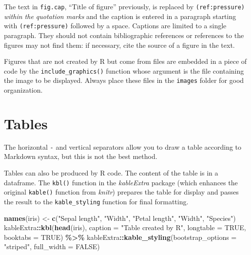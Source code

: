 \documentclass[
  12pt,
  american,
  a4paper,
  extrafontsizes,onecolumn,openright
  ]{memoir}
\newenvironment{Shaded}{\begin{snugshade}}{\end{snugshade}}
\newcommand{\AttributeTok}[1]{\textcolor[rgb]{0.13,0.29,0.53}{#1}}
\newcommand{\ConstantTok}[1]{\textcolor[rgb]{0.56,0.35,0.01}{#1}}
\newcommand{\FunctionTok}[1]{\textcolor[rgb]{0.13,0.29,0.53}{\textbf{#1}}}
\newcommand{\NormalTok}[1]{#1}
\newcommand{\OtherTok}[1]{\textcolor[rgb]{0.56,0.35,0.01}{#1}}
\newcommand{\SpecialCharTok}[1]{\textcolor[rgb]{0.81,0.36,0.00}{\textbf{#1}}}
\newcommand{\StringTok}[1]{\textcolor[rgb]{0.31,0.60,0.02}{#1}}
\begin{document}
\normalsize

The text in \texttt{fig.cap}, \enquote{Title of figure} previously, is replaced by \texttt{(ref:pressure)} \emph{within the quotation marks} and the caption is entered in a paragraph starting with \texttt{(ref:pressure)} followed by a space.
Captions are limited to a single paragraph.
They should not contain bibliographic references or references to the figures may not find them: if necessary, cite the source of a figure in the text.

Figures that are not created by R but come from files are embedded in a piece of code by the \texttt{include\_graphics()} function whose argument is the file containing the image to be displayed.
Always place these files in the \texttt{images} folder for good organization.

\section{Tables}\label{tables}

The horizontal \texttt{-} and vertical separators \texttt{\textbar{}} allow you to draw a table according to Markdown syntax, but this is not the best method.

Tables can also be produced by R code.
The content of the table is in a dataframe.
The \texttt{kbl()} function in the \emph{kableExtra} package (which enhances the original \texttt{kable()} function from \emph{knitr}) prepares the table for display and passes the result to the \texttt{kable\_styling} function for final formatting.

\scriptsize

\begin{Shaded}
\begin{Highlighting}[]
\FunctionTok{names}\NormalTok{(iris) }\OtherTok{\textless{}{-}} \FunctionTok{c}\NormalTok{(}\StringTok{"Sepal length"}\NormalTok{, }\StringTok{"Width"}\NormalTok{, }\StringTok{"Petal length"}\NormalTok{, }\StringTok{"Width"}\NormalTok{,}
    \StringTok{"Species"}\NormalTok{)}
\NormalTok{kableExtra}\SpecialCharTok{::}\FunctionTok{kbl}\NormalTok{(}\FunctionTok{head}\NormalTok{(iris), }\AttributeTok{caption =} \StringTok{"Table created by R"}\NormalTok{, }\AttributeTok{longtable =} \ConstantTok{TRUE}\NormalTok{,}
    \AttributeTok{booktabs =} \ConstantTok{TRUE}\NormalTok{) }\SpecialCharTok{\%\textgreater{}\%}
\NormalTok{    kableExtra}\SpecialCharTok{::}\FunctionTok{kable\_styling}\NormalTok{(}\AttributeTok{bootstrap\_options =} \StringTok{"striped"}\NormalTok{,}
        \AttributeTok{full\_width =} \ConstantTok{FALSE}\NormalTok{)}
\end{Highlighting}
\end{Shaded}
\end{document}
